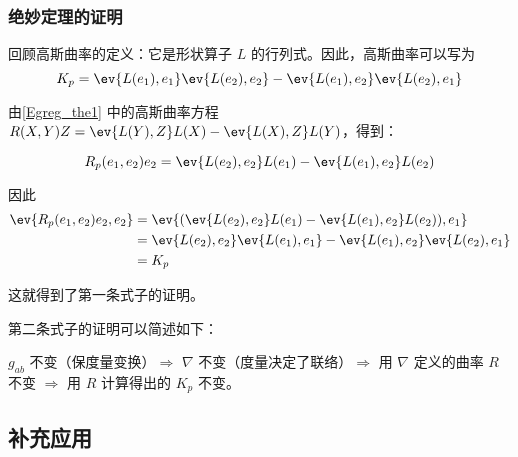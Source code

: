 \subsubsection{绝妙定理的证明}

回顾高斯曲率的定义：它是形状算子 $L$ 的行列式。因此，高斯曲率可以写为
\begin{equation}
K_p=\ev{L(e_1), e_1}\ev{L(e_2), e_2}-\ev{L(e_1), e_2}\ev{L(e_2), e_1}
\end{equation}

由\autoref{Egreg_the1} 中的高斯曲率方程 $R(X, Y)Z=\ev{L(Y), Z}L(X)-\ev{L(X), Z}L(Y)$，得到：

\begin{equation}
R_p(e_1, e_2)e_2=\ev{L(e_2), e_2}L(e_1)-\ev{L(e_1), e_2}L(e_2)
\end{equation}

因此
\begin{equation}
\begin{aligned}
\ev{R_p(e_1, e_2)e_2, e_2}&=\ev{(\ev{L(e_2), e_2}L(e_1)-\ev{L(e_1), e_2}L(e_2)), e_1}\\
&=\ev{L(e_2), e_2}\ev{L(e_1), e_1}-\ev{L(e_1), e_2}\ev{L(e_2), e_1}\\
&=K_p
\end{aligned}
\end{equation}

这就得到了第一条式子的证明。

第二条式子的证明可以简述如下：

$g_{ab}$ 不变（保度量变换）$\Rightarrow$ $\nabla$ 不变（度量决定了联络）$\Rightarrow$ 用 $\nabla$ 定义的曲率 $R$ 不变 $\Rightarrow$ 用 $R$ 计算得出的 $K_p$ 不变。



\subsection{补充应用}



